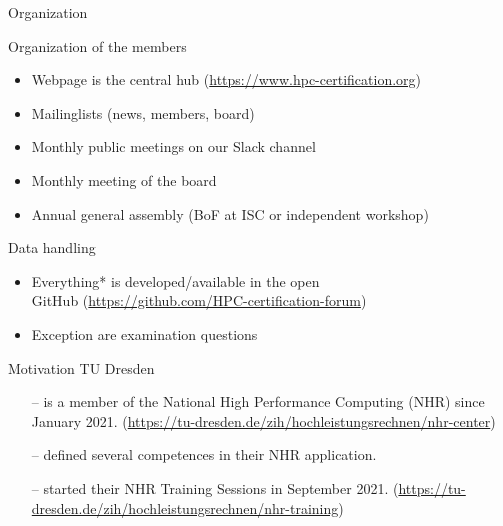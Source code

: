 \documentclass[compress,aspectratio=169]{beamer}
\begin{document}
\begin{frame}{Organization}
  \begin{block}{Organization of the members}
	\begin{itemize}
  \item Webpage is the central hub (\url{https://www.hpc-certification.org})
  \item Mailinglists (news, members, board)
	\item Monthly public meetings on our Slack channel
  \item Monthly meeting of the board
  \item Annual general assembly (BoF at ISC or independent workshop)
  \end{itemize}
  \end{block}

  \begin{block}{Data handling}
    \begin{itemize}
      \item Everything* is developed/available in the open \\
        GitHub (\url{https://github.com/HPC-certification-forum})
      \item Exception are examination questions
    \end{itemize}
  \end{block}
\end{frame}












\begin{frame}[plain]{Motivation}
TU Dresden
\begin{itemize}
 \item[--] is a member of the National High Performance Computing (NHR) since January 2021. (\small{\url{https://tu-dresden.de/zih/hochleistungsrechnen/nhr-center}})
 \item[--] defined several competences in their NHR application.

 \item[--] started their NHR Training Sessions in September 2021. (\small{\url{https://tu-dresden.de/zih/hochleistungsrechnen/nhr-training}}) 
\end{itemize}

\end{frame}
\end{document}
